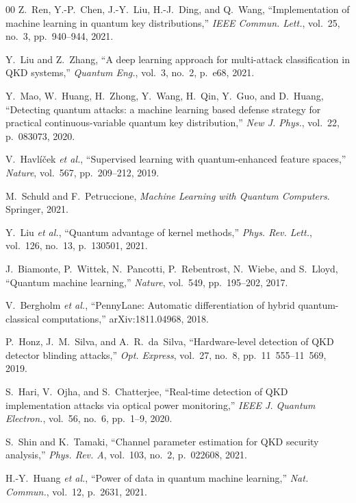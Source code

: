 \documentclass[conference,10pt]{IEEEtran}
\begin{document}
\begin{thebibliography}{00}
Z.~Ren, Y.-P.~Chen, J.-Y.~Liu, H.-J.~Ding, and Q.~Wang, ``Implementation of machine learning in quantum key distributions,'' \textit{IEEE Commun. Lett.}, vol.~25, no.~3, pp.~940--944, 2021.

Y.~Liu and Z.~Zhang, ``A deep learning approach for multi-attack classification in QKD systems,'' \textit{Quantum Eng.}, vol.~3, no.~2, p.~e68, 2021.

Y.~Mao, W.~Huang, H.~Zhong, Y.~Wang, H.~Qin, Y.~Guo, and D.~Huang, ``Detecting quantum attacks: a machine learning based defense strategy for practical continuous-variable quantum key distribution,'' \textit{New J. Phys.}, vol.~22, p.~083073, 2020.

V.~Havl\'{i}\v{c}ek \textit{et al.}, ``Supervised learning with quantum-enhanced feature spaces,'' \textit{Nature}, vol.~567, pp.~209--212, 2019.

M.~Schuld and F.~Petruccione, \textit{Machine Learning with Quantum Computers}. Springer, 2021.

Y.~Liu \textit{et al.}, ``Quantum advantage of kernel methods,'' \textit{Phys. Rev. Lett.}, vol.~126, no.~13, p.~130501, 2021.

J.~Biamonte, P.~Wittek, N.~Pancotti, P.~Rebentrost, N.~Wiebe, and S.~Lloyd, ``Quantum machine learning,'' \textit{Nature}, vol.~549, pp.~195--202, 2017.

V.~Bergholm \textit{et al.}, ``PennyLane: Automatic differentiation of hybrid quantum-classical computations,'' arXiv:1811.04968, 2018.

P.~Honz, J.~M.~Silva, and A.~R.~da~Silva, ``Hardware-level detection of QKD detector blinding attacks,'' \textit{Opt. Express}, vol.~27, no.~8, pp.~11~555--11~569, 2019.

S.~Hari, V.~Ojha, and S.~Chatterjee, ``Real-time detection of QKD implementation attacks via optical power monitoring,'' \textit{IEEE J. Quantum Electron.}, vol.~56, no.~6, pp.~1--9, 2020.

S.~Shin and K.~Tamaki, ``Channel parameter estimation for QKD security analysis,'' \textit{Phys. Rev. A}, vol.~103, no.~2, p.~022608, 2021.

H.-Y.~Huang \textit{et al.}, ``Power of data in quantum machine learning,'' \textit{Nat. Commun.}, vol.~12, p.~2631, 2021.


\end{thebibliography}
\end{document}
